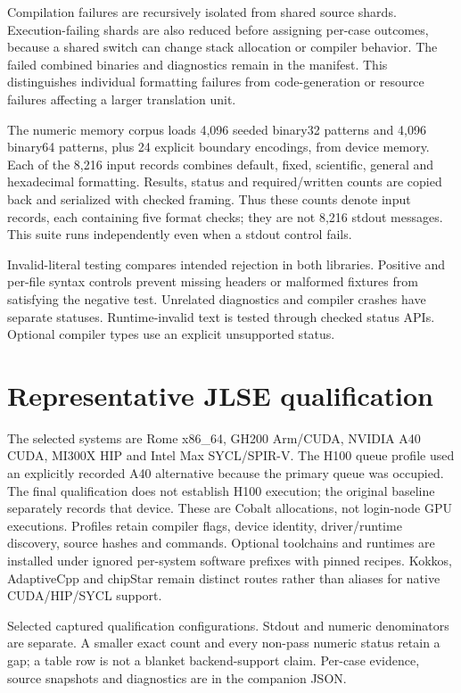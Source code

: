 \documentclass[11pt,letterpaper]{article}
\begin{document}
Compilation failures are recursively isolated from shared source shards.
Execution-failing shards are also reduced before assigning per-case outcomes,
because a shared switch can change stack allocation or compiler behavior.
The failed combined binaries and diagnostics remain in the manifest. This
distinguishes individual formatting failures from code-generation or resource
failures affecting a larger translation unit.

The numeric memory corpus loads 4,096 seeded binary32 patterns and 4,096
binary64 patterns, plus 24 explicit boundary encodings, from device memory.
Each of the 8,216 input records combines default, fixed, scientific, general
and hexadecimal formatting. Results, status and required/written counts are
copied back and serialized with checked framing. Thus these counts denote
input records, each containing five format checks; they are not 8,216 stdout
messages. This suite runs independently even when a stdout control fails.

Invalid-literal testing compares intended rejection in both libraries.
Positive and per-file syntax controls prevent missing headers or malformed
fixtures from satisfying the negative test. Unrelated diagnostics and compiler
crashes have separate statuses. Runtime-invalid text is tested through checked
status APIs. Optional compiler types use an explicit unsupported status.

\section{Representative JLSE qualification}

The selected systems are Rome x86\_64, GH200 Arm/CUDA, NVIDIA A40 CUDA,
MI300X HIP and Intel Max SYCL/SPIR-V. The H100 queue profile used an explicitly
recorded A40 alternative because the primary queue was occupied. The final
qualification does not establish H100 execution; the original baseline separately
records that device. These are Cobalt allocations,
not login-node GPU executions. Profiles retain compiler flags, device identity,
driver/runtime discovery, source hashes and commands. Optional toolchains and
runtimes are installed under ignored per-system software prefixes with pinned
recipes. Kokkos, AdaptiveCpp and chipStar remain distinct routes rather than
aliases for native CUDA/HIP/SYCL support.

\qualificationtable
Selected captured qualification configurations. Stdout and numeric
denominators are separate. A smaller exact count and every non-pass numeric
status retain a gap; a table row is not a blanket backend-support claim.
Per-case evidence, source snapshots and diagnostics are in the companion JSON.
\end{document}

